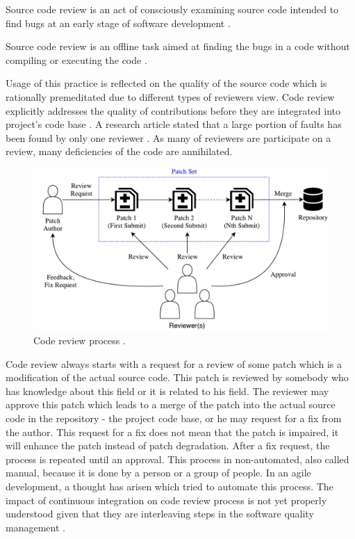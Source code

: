 \begin{DEF}
Source code review is an act of consciously examining source code intended to find bugs at an early stage of software development \cite{CodeReview_eye_tracking}.
\end{DEF}

\begin{DEF}
Source code review is an offline task aimed at finding the bugs in a code without compiling or executing the code \cite{CodeReview_eye_tracking}.
\end{DEF}

Usage of this practice is reflected on the quality of the source code which is rationally premeditated due to different types of reviewers view. Code review explicitly addresses the quality of contributions before they are integrated into project's code base \cite{CodeReview_quality}. A research article stated that a large portion of faults has been found by only one reviewer \cite{CodeReview_evaluation}. As many of reviewers are participate on a review, many deficiencies of the code are annihilated.

\begin{figure}[H]
    \centering
    \includegraphics[scale=0.5]{img/process_of_review.pdf}
    \caption{Code review process \cite{CodeReview_IFstatement}.}
    \label{fig:review_process}
\end{figure}

Code review always starts with a request for a review of some patch which is a modification of the actual source code. This patch is reviewed by somebody who has knowledge about this field or it is related to his field. The reviewer may approve this patch which leads to a merge of the patch into the actual source code in the repository - the project code base, or he may request for a fix from the author. This request for a fix does not mean that the patch is impaired, it will enhance the patch instead of patch degradation. After a fix request, the process is repeated until an approval. This process in non-automated, also called manual, because it is done by a person or a group of people. In an agile development, a thought has arisen which tried to automate this process. The impact of continuous integration on code review process is not yet properly understood given that they are interleaving steps in the software quality management \cite{CodeReview_impact_of_CI}.

